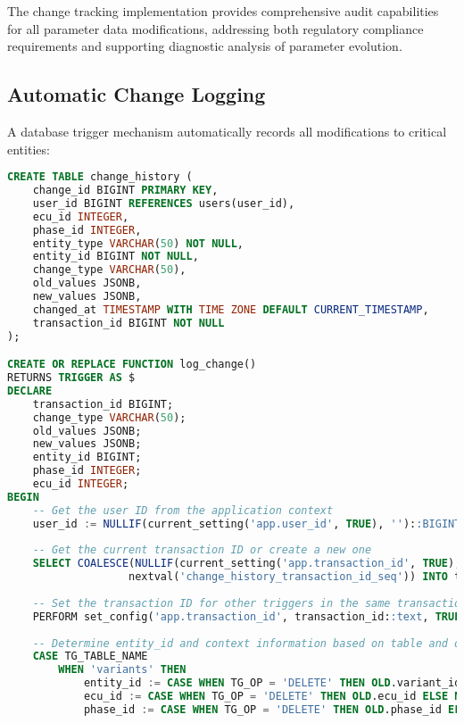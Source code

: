 The change tracking implementation provides comprehensive audit capabilities for all parameter data modifications, addressing both regulatory compliance requirements and supporting diagnostic analysis of parameter evolution.

\subsection{Automatic Change Logging}
\label{subsec:automatic-change-logging}

A database trigger mechanism automatically records all modifications to critical entities:

\begin{lstlisting}[language=SQL, caption={Change Tracking Trigger}, label={lst:change-tracking-trigger}]
CREATE TABLE change_history (
    change_id BIGINT PRIMARY KEY,
    user_id BIGINT REFERENCES users(user_id),
    ecu_id INTEGER,
    phase_id INTEGER,
    entity_type VARCHAR(50) NOT NULL,
    entity_id BIGINT NOT NULL,
    change_type VARCHAR(50),
    old_values JSONB,
    new_values JSONB,
    changed_at TIMESTAMP WITH TIME ZONE DEFAULT CURRENT_TIMESTAMP,
    transaction_id BIGINT NOT NULL
);

CREATE OR REPLACE FUNCTION log_change()
RETURNS TRIGGER AS $
DECLARE
    transaction_id BIGINT;
    change_type VARCHAR(50);
    old_values JSONB;
    new_values JSONB;
    entity_id BIGINT;
    phase_id INTEGER;
    ecu_id INTEGER;
BEGIN
    -- Get the user ID from the application context
    user_id := NULLIF(current_setting('app.user_id', TRUE), '')::BIGINT;
    
    -- Get the current transaction ID or create a new one
    SELECT COALESCE(NULLIF(current_setting('app.transaction_id', TRUE), '')::BIGINT, 
                   nextval('change_history_transaction_id_seq')) INTO transaction_id;
    
    -- Set the transaction ID for other triggers in the same transaction
    PERFORM set_config('app.transaction_id', transaction_id::text, TRUE);
    
    -- Determine entity_id and context information based on table and operation
    CASE TG_TABLE_NAME 
        WHEN 'variants' THEN 
            entity_id := CASE WHEN TG_OP = 'DELETE' THEN OLD.variant_id ELSE NEW.variant_id END;
            ecu_id := CASE WHEN TG_OP = 'DELETE' THEN OLD.ecu_id ELSE NEW.ecu_id END;
            phase_id := CASE WHEN TG_OP = 'DELETE' THEN OLD.phase_id ELSE NEW.phase_id END;
            

\end{lstlisting}
